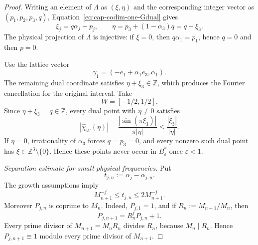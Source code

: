 \documentclass[10pt,a4paper]{amsart}
\begin{document}
\begin{proof}
Writing an element of $\Lambda$ as $(\xi,\eta)$ and the corresponding integer
vector as $(p_1,p_2,p_3,q)$, Equation~\eqref{eq:cap-codim-one-Gdual} gives
\begin{equation}\label{eq:cap-codim-one-dual-coordinates}
  \xi_j=q\alpha_j-p_j,
  \qquad
  \eta=p_3+(1-\alpha_3)q=q-\xi_3.
\end{equation}
The physical projection of $\Lambda$ is injective: if $\xi=0$, then
$q\alpha_1=p_1$, hence $q=0$ and then $p=0$.

Use the lattice vector
\begin{equation}\label{eq:cap-codim-one-primal-vectors}
  \gamma_1=(-e_1+\alpha_1e_3,\alpha_1).
\end{equation}
The remaining dual coordinate satisfies $\eta+\xi_3\in\mathbb Z$, which
produces the Fourier cancellation for the original interval.  Take
\begin{equation}\label{eq:cap-codim-one-window}
  W=[-1/2,1/2].
\end{equation}
Since $\eta+\xi_3=q\in\mathbb Z$, every dual point with $\eta\neq0$
satisfies
\begin{equation}\label{eq:cap-codim-one-window-cancellation}
  |\widehat{\chi}_W(\eta)|
  =\frac{|\sin(\pi\xi_3)|}{\pi|\eta|}
  \leq\frac{|\xi_3|}{|\eta|}.
\end{equation}
If $\eta=0$, irrationality of $\alpha_3$ forces $q=p_3=0$, and every
nonzero such dual point has $\xi\in\mathbb Z^3\setminus\{0\}$.  Hence these
points never occur in $B_\varepsilon^*$ once $\varepsilon<1$.

\smallskip\noindent\emph{Separation estimate for small physical frequencies.}
Put
\begin{equation}\label{eq:cap-codim-one-tails}
  t_{j,n}:=\alpha_j-\alpha_{j,n}.
\end{equation}
The growth assumptions imply
\begin{equation}\label{eq:cap-codim-one-tail-bounds}
  M_{n+1}^{-j}\leq t_{j,n}\leq2M_{n+1}^{-j}.
\end{equation}
Moreover $P_{j,n}$ is coprime to $M_n$.  Indeed, $P_{j,1}=1$, and if
$R_n:=M_{n+1}/M_n$, then
\begin{equation}\label{eq:cap-codim-one-prefix-recurrence}
  P_{j,n+1}=R_n^jP_{j,n}+1.
\end{equation}
Every prime divisor of $M_{n+1}=M_nR_n$ divides $R_n$, because
$M_n\mid R_n$.  Hence $P_{j,n+1}\equiv1$ modulo every prime divisor of
$M_{n+1}$.


\end{proof}
\end{document}
